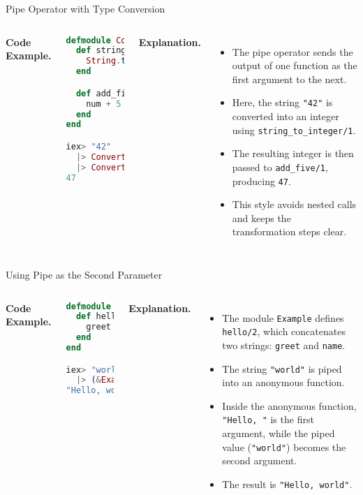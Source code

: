 \documentclass[aspectratio=169, table]{beamer}
\begin{document}
\begin{frame}[fragile]{Pipe Operator with Type Conversion}
\vspace{20pt}
\begin{columns}[t]

\textbf{Code Example.}

\begin{lstlisting}[language=Elixir]
defmodule Converter do
  def string_to_integer(str) do
    String.to_integer(str)
  end

  def add_five(num) do
    num + 5
  end
end

iex> "42"
  |> Converter.string_to_integer()
  |> Converter.add_five()
47
\end{lstlisting}

\textbf{Explanation.}  
\begin{itemize}
  \item The pipe operator sends the output of one function as the first argument to the next.  
  \item Here, the string \texttt{"42"} is converted into an integer using \texttt{string\_to\_integer/1}.  
  \item The resulting integer is then passed to \texttt{add\_five/1}, producing \texttt{47}.  
  \item This style avoids nested calls and keeps the transformation steps clear.  
\end{itemize}

\end{columns}
\end{frame}

\begin{frame}[fragile]{Using Pipe as the Second Parameter}
\vspace{20pt}
\begin{columns}[t]

\textbf{Code Example.}

\begin{lstlisting}[language=Elixir]
defmodule Example do
  def hello(greet, name) do
    greet <> name
  end
end

iex> "world"
  |> (&Example.hello("Hello, ", &1)).()
"Hello, world"
\end{lstlisting}

\textbf{Explanation.}  
\begin{itemize}
  \item The module \texttt{Example} defines \texttt{hello/2},  
        which concatenates two strings: \texttt{greet} and \texttt{name}.  
  \item The string \texttt{"world"} is piped into an anonymous function.  
  \item Inside the anonymous function, \texttt{"Hello, "} is the first argument,  
        while the piped value (\texttt{"world"}) becomes the second argument.  
  \item The result is \texttt{"Hello, world"}.  
\end{itemize}

\end{columns}
\end{frame}
\end{document}
